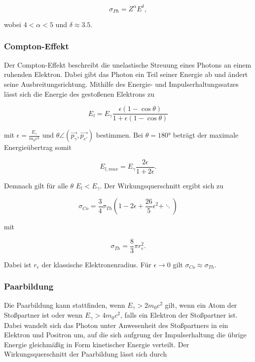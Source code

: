 \begin{equation*}
    \sigma_{Ph} = Z^\alpha E^\delta,
\end{equation*}

wobei $\num{4}<\alpha<\num{5}$ und $\delta \approx \num{3.5} $.

\subsubsection{Compton-Effekt}

Der Compton-Effekt beschreibt die unelastische Streuung eines Photons an einem ruhenden Elektron. Dabei gibt das Photon ein Teil seiner Energie ab 
und ändert seine Ausbreitungsrichtung. Mithilfe des Energie- und Impulserhaltungssatzes lässt sich die Energie des gestoßenen Elektrons zu 

\begin{equation*}
    E_l = E_\gamma \frac{\epsilon\left(1-\cos{\theta}\right)}{1+\epsilon\left(1-\cos{\theta}\right)}
\end{equation*}

mit $\epsilon = \frac{E_\gamma}{m_0 c^2}$ und $\theta \angle (\vec{p_\gamma}, \vec{p_{e'}})$ bestimmen. Bei $\theta = 180°$ beträgt der 
maximale Energieübertrag somit

\begin{equation*}
    E_{l,max} = E_\gamma \frac{2\epsilon}{1+2\epsilon}.
    \label{eqn:Kante}
\end{equation*}

Demnach gilt für alle $\theta$ $E_l < E_\gamma$. Der Wirkungsquerschnitt ergibt sich zu 

\begin{equation*}
    \sigma_{Co} = \frac{3}{4}\sigma_{Th}\left(1-2\epsilon+\frac{26}{5}\epsilon^2+\ddots\right)
\end{equation*}

mit 

\begin{equation*}
    \sigma_{Th} = \frac{8}{3}\pi r_e^2.
\end{equation*}

Dabei ist $r_e$ der klassische Elektronenradius. Für $\epsilon\rightarrow 0$ gilt $\sigma_{Co} \approx \sigma_{Th}$.

\subsubsection{Paarbildung}

Die Paarbildung kann stattfinden, wenn $E_\gamma>2m_0c^2$ gilt, wenn ein Atom der Stoßpartner ist oder wenn $E_\gamma > 4m_0c^2$, falls 
ein Elektron der Stoßpartner ist. Dabei wandelt sich das Photon unter Anwesenheit des Stoßpartners in ein Elektron und Positron um, 
auf die sich aufgrung der Impulserhaltung die übrige Energie gleichmäßig in Form kinetischer Energie verteilt. Der Wirkungsquerschnitt
der Paarbildung lässt sich durch 

